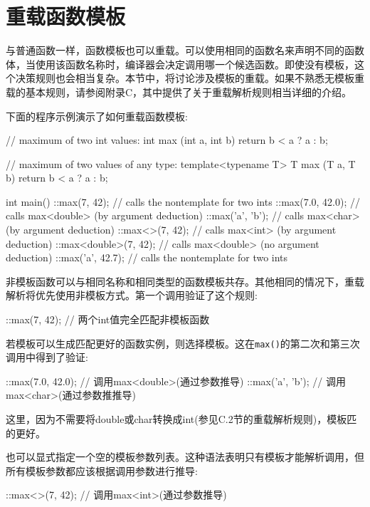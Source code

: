\section{重载函数模板}

与普通函数一样，函数模板也可以重载。可以使用相同的函数名来声明不同的函数体，当使用该函数名称时，编译器会决定调用哪一个候选函数。即使没有模板，这个决策规则也会相当复杂。本节中，将讨论涉及模板的重载。如果不熟悉无模板重载的基本规则，请参阅附录C，其中提供了关于重载解析规则相当详细的介绍。

下面的程序示例演示了如何重载函数模板:

\begin{cpp}
// maximum of two int values:
int max (int a, int b)
{
	return b < a ? a : b;
}

// maximum of two values of any type:
template<typename T>
T max (T a, T b)
{
	return b < a ? a : b;
}

int main()
{
	::max(7, 42); // calls the nontemplate for two ints
	::max(7.0, 42.0); // calls max<double> (by argument deduction)
	::max('a', 'b'); // calls max<char> (by argument deduction)
	::max<>(7, 42); // calls max<int> (by argument deduction)
	::max<double>(7, 42); // calls max<double> (no argument deduction)
	::max('a', 42.7); // calls the nontemplate for two ints
}
\end{cpp}

非模板函数可以与相同名称和相同类型的函数模板共存。其他相同的情况下，重载解析将优先使用非模板方式。第一个调用验证了这个规则:

\begin{cpp}
::max(7, 42); // 两个int值完全匹配非模板函数
\end{cpp}

若模板可以生成匹配更好的函数实例，则选择模板。这在\texttt{max()}的第二次和第三次调用中得到了验证:

\begin{cpp}
::max(7.0, 42.0); // 调用max<double>(通过参数推导)
::max('a', 'b'); // 调用max<char>(通过参数推推导)
\end{cpp}

这里，因为不需要将double或char转换成int(参见C.2节的重载解析规则)，模板匹的更好。

也可以显式指定一个空的模板参数列表。这种语法表明只有模板才能解析调用，但所有模板参数都应该根据调用参数进行推导:

\begin{cpp}
::max<>(7, 42); // 调用max<int>(通过参数推导)
\end{cpp}

